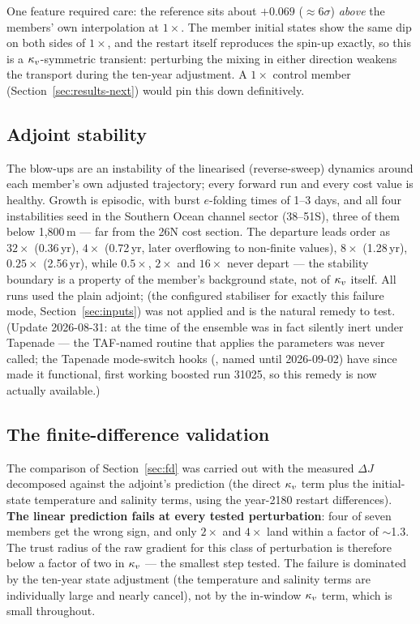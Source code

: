 One feature required care: the reference sits about $+0.069$ ($\approx6\sigma$)
\emph{above} the members' own interpolation at $1\times$. The member initial
states show the same dip on both sides of $1\times$, and the restart itself
reproduces the spin-up exactly, so this is a $\kappa_{v}$-symmetric transient: perturbing
the mixing in either direction weakens the transport during the ten-year
adjustment. A $1\times$ control member (Section~\ref{sec:results-next}) would
pin this down definitively.

\subsection{Adjoint stability}
\label{sec:results-stability}

The blow-ups are an instability of the linearised (reverse-sweep) dynamics
around each member's own adjusted trajectory; every forward run and every cost
value is healthy. Growth is episodic, with burst $e$-folding times of 1--3
days, and all four instabilities seed in the Southern Ocean channel sector
(38--51\dg S), three of them below 1{,}800\,m --- far from the 26\dg N cost
section. The departure leads order as $32\times$ (0.36\,yr), $4\times$
(0.72\,yr, later overflowing to non-finite values), $8\times$ (1.28\,yr),
$0.25\times$ (2.56\,yr), while $0.5\times$, $2\times$ and $16\times$ never
depart --- the stability boundary is a property of the member's background
state, not of $\kappa_{v}$ itself. All runs used the plain adjoint;
 (the configured stabiliser for exactly this failure mode,
Section~\ref{sec:inputs}) was not applied and is the natural remedy to test.
(Update 2026-08-31: at the time of the ensemble  was in
fact silently inert under Tapenade --- the TAF-named routine that applies the
 parameters was never called; the Tapenade mode-switch hooks
(, named  until
2026-09-02) have since made it functional, first working boosted run 31025, so
this remedy is now actually available.)

\subsection{The finite-difference validation}
\label{sec:results-fd}

The comparison of Section~\ref{sec:fd} was carried out with the measured
$\Delta J$ decomposed against the adjoint's prediction (the direct $\kappa_{v}$ term
plus the initial-state temperature and salinity terms, using the year-2180
restart differences). \textbf{The linear prediction fails at every tested
perturbation}: four of seven members get the wrong sign, and only $2\times$ and
$4\times$ land within a factor of $\sim$1.3. The trust radius of the raw
gradient for this class of perturbation is therefore below a factor of two in
$\kappa_{v}$ --- the smallest step tested. The failure is dominated by the ten-year
state adjustment (the temperature and salinity terms are individually large and
nearly cancel), not by the in-window $\kappa_{v}$ term, which is small throughout.

